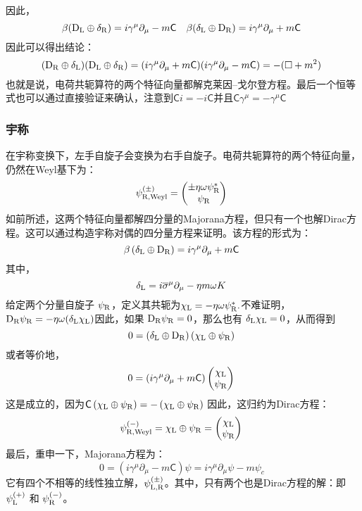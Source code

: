 因此，
\[
\beta (\mathrm{D}_{\rm{L}} \oplus \delta_{\rm{R}}) = i \gamma^{\mu} \partial_{\mu} - m \mathsf{C} \quad \beta (\delta_{\rm{L}} \oplus \mathrm{D}_{\rm{R}}) = i \gamma^{\mu} \partial_{\mu} + m \mathsf{C}~
\]
因此可以得出结论：
\[
(\mathrm{D}_{\rm{R}} \oplus \delta_{\rm{L}})(\mathrm{D}_{\rm{L}} \oplus \delta_{\rm{R}}) = (i \gamma^{\mu} \partial_{\mu} + m \mathsf{C})(i \gamma^{\mu} \partial_{\mu} - m \mathsf{C}) = -(\square + m^2)~
\]
也就是说，电荷共轭算符的两个特征向量都解克莱因–戈尔登方程。最后一个恒等式也可以通过直接验证来确认，注意到\(\mathsf{C} i = -i \mathsf{C}\)并且\(\mathsf{C} \gamma^{\mu} = -\gamma^{\mu} \mathsf{C}\)

\subsubsection{宇称}  
在宇称变换下，左手自旋子会变换为右手自旋子。电荷共轭算符的两个特征向量，仍然在Weyl基下为：
\[
\psi_{\rm{R},{\text{Weyl}}}^{(\pm)} = \begin{pmatrix} \pm \eta \omega \psi_{\rm{R}}^{*} \\ \psi_{\rm{R}} \end{pmatrix}~
\]
如前所述，这两个特征向量都解四分量的Majorana方程，但只有一个也解Dirac方程。这可以通过构造宇称对偶的四分量方程来证明。该方程的形式为：
\[
\beta \left( \delta_{\rm{L}} \oplus \mathrm{D}_{\rm{R}} \right) = i \gamma^{\mu} \partial_{\mu} + m \mathsf{C}~
\]
其中，
\[
\delta_{\rm{L}} = i \overline{\sigma}^{\mu} \partial_{\mu} - \eta m \omega K~
\]
给定两个分量自旋子 \(\psi_{\rm{R}}\)，定义其共轭为\(\chi_{\rm{L}} = -\eta \omega \psi_{\rm{R}}^{*}.\)不难证明，\(\mathrm{D}_{\rm{R}} \psi_{\rm{R}} = -\eta \omega (\delta_{\rm{L}} \chi_{\rm{L}})\)因此，如果 \(\mathrm{D}_{\rm{R}} \psi_{\rm{R}} = 0\)，那么也有 \(\delta_{\rm{L}} \chi_{\rm{L}} = 0\)，从而得到
\[
0 = \left( \delta_{\rm{L}} \oplus \mathrm{D}_{\rm{R}} \right) \left( \chi_{\rm{L}} \oplus \psi_{\rm{R}} \right)~
\]
或者等价地，
\[
0 = \left( i \gamma^{\mu} \partial_{\mu} + m \mathsf{C} \right) \begin{pmatrix} \chi_{\rm{L}} \\ \psi_{\rm{R}} \end{pmatrix}~
\]
这是成立的，因为\(\mathsf{C} \left( \chi_{\rm{L}} \oplus \psi_{\rm{R}} \right) = -\left( \chi_{\rm{L}} \oplus \psi_{\rm{R}} \right)\)
因此，这归约为Dirac方程：
\[
\psi_{{\rm{R}},{\text{Weyl}}}^{(-)} = \chi_{\rm{L}} \oplus \psi_{\rm{R}} = \begin{pmatrix} \chi_{\rm{L}} \\ \psi_{\rm{R}} \end{pmatrix}~
\]
最后，重申一下，Majorana方程为：
\[
0 = \left( i \gamma^{\mu} \partial_{\mu} - m \mathsf{C} \right) \psi = i \gamma^{\mu} \partial_{\mu} \psi - m \psi_{c}~
\]
它有四个不相等的线性独立解，\(\psi_{\rm{L,R}}^{(\pm)}\)。其中，只有两个也是Dirac方程的解：即 \(\psi_{\rm{L}}^{(+)}\) 和 \(\psi_{\rm{R}}^{(-)}\)。
